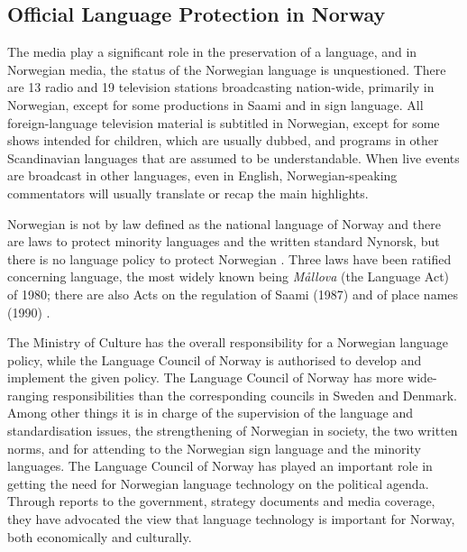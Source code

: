 \begin{multicols}{2}
\subsection{Official Language Protection in Norway}

The media play a significant role in the preservation of a language, and in Norwegian media, the status of the Norwegian language is unquestioned. 
There are 13 radio and 19 television stations broadcasting nation-wide, primarily in Norwegian, except for some productions in Saami and in sign language.
All foreign-language television material is subtitled in Norwegian, except for some shows intended for children, which are usually dubbed, and programs in other Scandinavian languages that are assumed to be understandable. 
When live events are broadcast in other languages, even in English, Norwegian-speaking commentators will usually translate or recap the main highlights. 

Norwegian is not by law defined as the national language of Norway and there are laws to protect minority languages and the written standard Nynorsk, but there is no language policy to protect Norwegian \cite{nih:2005}. 
Three laws have been ratified concerning language, the most widely known being \textit{Mållova} (the Language Act) of 1980; there are also Acts on the regulation of Saami (1987) and of place names (1990) \cite{stm35:2008}.

The Ministry of Culture has the overall responsibility for a Norwegian language policy, while the Language Council of Norway is authorised to develop and implement the given policy. 
The Language Council of Norway has more wide-ranging responsibilities than the corresponding councils in Sweden and Denmark. 
Among other things it is in charge of the supervision of the language and standardisation issues, the strengthening of Norwegian in society, the two written norms, and for attending to the Norwegian sign language and the minority languages. 
The Language Council of Norway has played an important role in getting the need for Norwegian language technology on the political agenda. 
Through reports to the government, strategy documents and media coverage, they have advocated the view that language technology is important for Norway, both economically and culturally.



\end{multicols}
